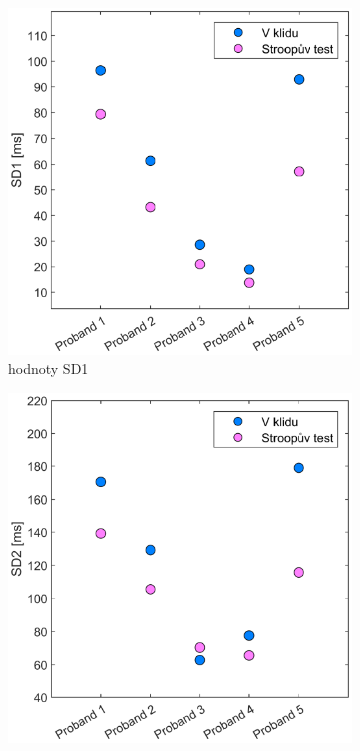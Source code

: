 \begin{figure}[H]
	\centering
	\begin{subfigure}[b]{0.45\textwidth}
		\centering
		\includegraphics[width=0.9\linewidth]{../assets/figures/results_sd1}
		\caption{hodnoty SD1}
		\label{fig:results_sd1}
	\end{subfigure}
	\hfill
	\begin{subfigure}[b]{0.45\textwidth}
		\centering
		\includegraphics[width=0.9\linewidth]{../assets/figures/results_sd2}

\end{subfigure}
\end{figure}
